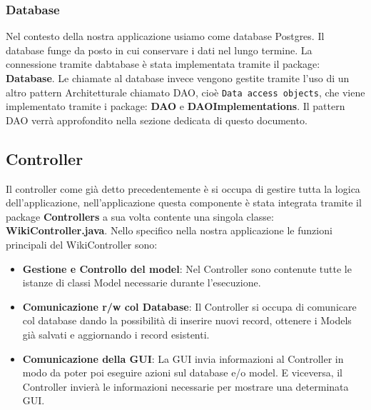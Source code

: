 \documentclass{article}
\begin{document}
		\subsubsection{Database}
		Nel contesto della nostra applicazione usiamo come database Postgres. Il database funge da posto in cui conservare i dati nel lungo termine. La connessione tramite dabtabase \`e stata implementata tramite il package: \textbf{Database}. Le chiamate al database invece vengono gestite tramite l'uso di un altro pattern Architetturale chiamato DAO, cioè \texttt{Data access objects}, che viene implementato tramite i package: \textbf{DAO} e \textbf{DAOImplementations}. 
		Il pattern DAO verrà approfondito nella sezione dedicata di questo documento.
		
		
	\subsection {Controller}
	Il controller come gi\`a detto precedentemente \`e si occupa di gestire tutta la logica dell'applicazione, nell'applicazione questa componente \`e stata integrata tramite il package \textbf{Controllers} a sua volta contente una singola classe: \textbf{WikiController.java}. Nello specifico nella nostra applicazione le funzioni principali del WikiController sono:
	
	\begin{itemize}
		\item \textbf{Gestione e Controllo del model}: Nel Controller sono contenute tutte le istanze di classi Model necessarie durante l'esecuzione.
		
		\item \textbf{Comunicazione r/w col Database}: Il Controller si occupa di comunicare col database dando la possibilità di inserire nuovi record, ottenere i Models già salvati e aggiornando i record esistenti.
		
		\item \textbf{Comunicazione della GUI}: La GUI invia informazioni al Controller in modo da poter poi eseguire azioni sul database e/o model. E viceversa, il Controller invierà le informazioni necessarie per mostrare una determinata GUI.
		\\\\
	
	\end{itemize}
	
	
\end{document}
